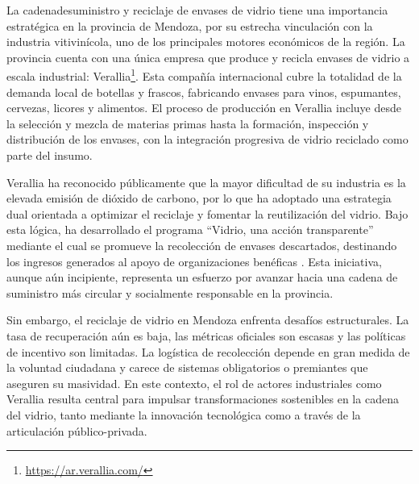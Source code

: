 La \gls{cadenadesuministro} y reciclaje de envases de vidrio tiene una importancia estratégica en la provincia de Mendoza, por su estrecha vinculación con la industria vitivinícola, uno de los principales motores económicos de la región. La provincia cuenta con una única empresa que produce y recicla envases de vidrio a escala industrial: Verallia\footnote{\url{https://ar.verallia.com/}}. Esta compañía internacional cubre la totalidad de la demanda local de botellas y frascos, fabricando envases para vinos, espumantes, cervezas, licores y alimentos. El proceso de producción en Verallia incluye desde la selección y mezcla de materias primas hasta la formación, inspección y distribución de los envases, con la integración progresiva de vidrio reciclado como parte del insumo.

Verallia ha reconocido públicamente que la mayor dificultad de su industria es la elevada emisión de dióxido de carbono, por lo que ha adoptado una estrategia dual orientada a optimizar el reciclaje y fomentar la reutilización del vidrio. Bajo esta lógica, ha desarrollado el programa ``Vidrio, una acción transparente'' mediante el cual se promueve la recolección de envases descartados, destinando los ingresos generados al apoyo de organizaciones benéficas \cite{vidriotransparente2024mendoza}. Esta iniciativa, aunque aún incipiente, representa un esfuerzo por avanzar hacia una cadena de suministro más circular y socialmente responsable en la provincia.

Sin embargo, el reciclaje de vidrio en Mendoza enfrenta desafíos estructurales. La tasa de recuperación aún es baja, las métricas oficiales son escasas y las políticas de incentivo son limitadas. La logística de recolección depende en gran medida de la voluntad ciudadana y carece de sistemas obligatorios o premiantes que aseguren su masividad. En este contexto, el rol de actores industriales como Verallia resulta central para impulsar transformaciones sostenibles en la cadena del vidrio, tanto mediante la innovación tecnológica como a través de la articulación público-privada.

